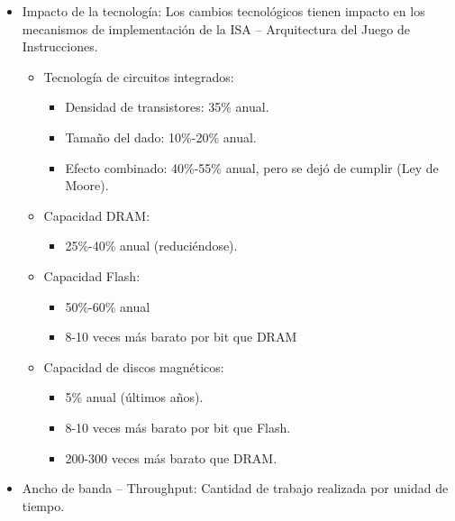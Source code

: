 \documentclass[12pt, twoside, openright]{report} %
\begin{document}
\begin{itemize}

	\item Impacto de la tecnología: Los cambios tecnológicos tienen impacto en
	      los mecanismos de implementación de la ISA -- Arquitectura del Juego
	      de Instrucciones.

	      \begin{itemize}

		      \item Tecnología de circuitos integrados:

		            \begin{itemize}

			            \item Densidad de transistores: 35\% anual.
			            \item Tamaño del dado: 10\%-20\% anual.
			            \item Efecto combinado: 40\%-55\% anual, pero se dejó de cumplir (Ley
			                  de Moore).
		            \end{itemize}
		      \item Capacidad DRAM:

		            \begin{itemize}

			            \item 25\%-40\% anual (reduciéndose).
		            \end{itemize}
		      \item Capacidad Flash:

		            \begin{itemize}

			            \item 50\%-60\% anual
			            \item 8-10 veces más barato por bit que DRAM
		            \end{itemize}
		      \item Capacidad de discos magnéticos:

		            \begin{itemize}

			            \item 5\% anual (últimos años).
			            \item 8-10 veces más barato por bit que Flash.
			            \item 200-300 veces más barato que DRAM.
		            \end{itemize}
	      \end{itemize}
	\item Ancho de banda -- Throughput: Cantidad de trabajo realizada por
	      unidad de tiempo.


\end{itemize}
\end{document}
